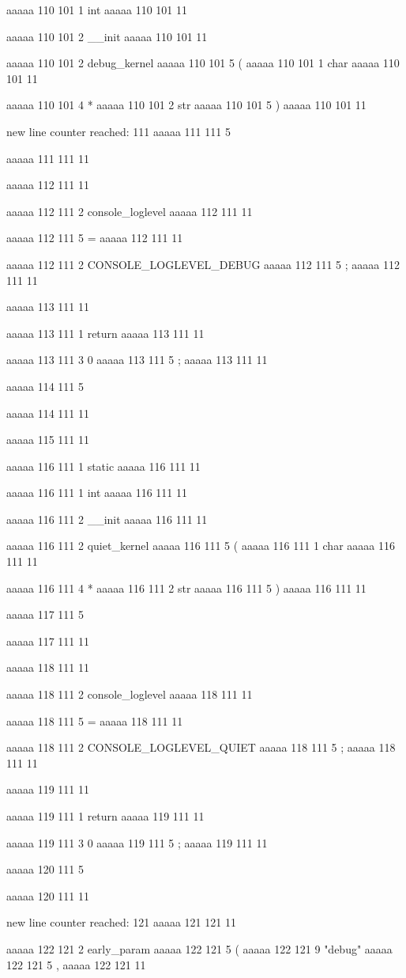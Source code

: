 aaaaa 110 101
1
int
aaaaa 110 101
11
 
aaaaa 110 101
2
__init
aaaaa 110 101
11
 
aaaaa 110 101
2
debug_kernel
aaaaa 110 101
5
(
aaaaa 110 101
1
char
aaaaa 110 101
11
 
aaaaa 110 101
4
*
aaaaa 110 101
2
str
aaaaa 110 101
5
)
aaaaa 110 101
11


new line counter reached: 111
aaaaa 111 111
5
{
aaaaa 111 111
11


aaaaa 112 111
11
	
aaaaa 112 111
2
console_loglevel
aaaaa 112 111
11
 
aaaaa 112 111
5
=
aaaaa 112 111
11
 
aaaaa 112 111
2
CONSOLE_LOGLEVEL_DEBUG
aaaaa 112 111
5
;
aaaaa 112 111
11


aaaaa 113 111
11
	
aaaaa 113 111
1
return
aaaaa 113 111
11
 
aaaaa 113 111
3
0
aaaaa 113 111
5
;
aaaaa 113 111
11


aaaaa 114 111
5
}
aaaaa 114 111
11


aaaaa 115 111
11


aaaaa 116 111
1
static
aaaaa 116 111
11
 
aaaaa 116 111
1
int
aaaaa 116 111
11
 
aaaaa 116 111
2
__init
aaaaa 116 111
11
 
aaaaa 116 111
2
quiet_kernel
aaaaa 116 111
5
(
aaaaa 116 111
1
char
aaaaa 116 111
11
 
aaaaa 116 111
4
*
aaaaa 116 111
2
str
aaaaa 116 111
5
)
aaaaa 116 111
11


aaaaa 117 111
5
{
aaaaa 117 111
11


aaaaa 118 111
11
	
aaaaa 118 111
2
console_loglevel
aaaaa 118 111
11
 
aaaaa 118 111
5
=
aaaaa 118 111
11
 
aaaaa 118 111
2
CONSOLE_LOGLEVEL_QUIET
aaaaa 118 111
5
;
aaaaa 118 111
11


aaaaa 119 111
11
	
aaaaa 119 111
1
return
aaaaa 119 111
11
 
aaaaa 119 111
3
0
aaaaa 119 111
5
;
aaaaa 119 111
11


aaaaa 120 111
5
}
aaaaa 120 111
11


new line counter reached: 121
aaaaa 121 121
11


aaaaa 122 121
2
early_param
aaaaa 122 121
5
(
aaaaa 122 121
9
"debug"
aaaaa 122 121
5
,
aaaaa 122 121
11
 

